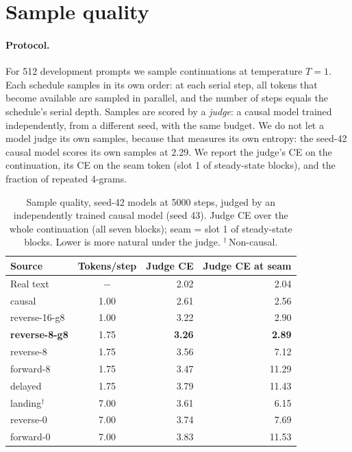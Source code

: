 \documentclass[11pt]{article}
\theoremstyle{definition}
\theoremstyle{remark}
\newcommand{\sch}[1]{\textsf{#1}}
\begin{document}
\section{Sample quality}
\label{sec:samples}

\paragraph{Protocol.}
For 512 development prompts we sample continuations at temperature $T=1$.
Each schedule samples in its own order: at each serial step, all tokens that become available are sampled in parallel, and the number of steps equals the schedule's serial depth.
Samples are scored by a \emph{judge}: a causal model trained independently, from a different seed, with the same budget.
We do not let a model judge its own samples, because that measures its own entropy: the seed-42 causal model scores its own samples at 2.29.
We report the judge's CE on the continuation, its CE on the seam token (slot 1 of steady-state blocks), and the fraction of repeated 4-grams.

\begin{table}[t]
  \centering
  \caption{Sample quality, seed-42 models at 5000 steps, judged by an independently trained causal model (seed 43). Judge CE over the whole continuation (all seven blocks); seam = slot 1 of steady-state blocks. Lower is more natural under the judge. $^\dagger$\,Non-causal.}
  \label{tab:samples}
  \small
  \begin{tabular}{lcrr}
    \toprule
    Source & Tokens/step & Judge CE & Judge CE at seam \\
    \midrule
    Real text            & $-$  & 2.02 & 2.04 \\
    \sch{causal}         & 1.00 & 2.61 & 2.56 \\
    \sch{reverse-16-g8}  & 1.00 & 3.22 & 2.90 \\
    \midrule
    \textbf{\sch{reverse-8-g8}} & 1.75 & \textbf{3.26} & \textbf{2.89} \\
    \sch{reverse-8}      & 1.75 & 3.56 & 7.12 \\
    \sch{forward-8}      & 1.75 & 3.47 & 11.29 \\
    \sch{delayed}        & 1.75 & 3.79 & 11.43 \\
    \midrule
    \sch{landing}$^\dagger$ & 7.00 & 3.61 & 6.15 \\
    \sch{reverse-0}      & 7.00 & 3.74 & 7.69 \\
    \sch{forward-0}      & 7.00 & 3.83 & 11.53 \\
    \bottomrule
  \end{tabular}
\end{table}
\end{document}
